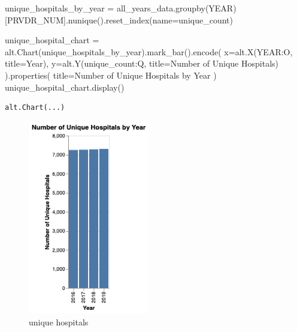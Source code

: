 \documentclass[
  letterpaper,
  DIV=11,
  numbers=noendperiod]{scrartcl}
\newenvironment{Shaded}{\begin{snugshade}}{\end{snugshade}}
\newcommand{\NormalTok}[1]{\textcolor[rgb]{0.00,0.23,0.31}{#1}}
\newcommand{\OperatorTok}[1]{\textcolor[rgb]{0.37,0.37,0.37}{#1}}
\newcommand{\StringTok}[1]{\textcolor[rgb]{0.13,0.47,0.30}{#1}}
\begin{document}
\begin{Shaded}
\begin{Highlighting}[]
\NormalTok{unique\_hospitals\_by\_year }\OperatorTok{=}\NormalTok{ all\_years\_data.groupby(}\StringTok{\textquotesingle{}YEAR\textquotesingle{}}\NormalTok{)[}\StringTok{\textquotesingle{}PRVDR\_NUM\textquotesingle{}}\NormalTok{].nunique().reset\_index(name}\OperatorTok{=}\StringTok{\textquotesingle{}unique\_count\textquotesingle{}}\NormalTok{)}

\NormalTok{unique\_hospital\_chart }\OperatorTok{=}\NormalTok{ alt.Chart(unique\_hospitals\_by\_year).mark\_bar().encode(}
\NormalTok{    x}\OperatorTok{=}\NormalTok{alt.X(}\StringTok{\textquotesingle{}YEAR:O\textquotesingle{}}\NormalTok{, title}\OperatorTok{=}\StringTok{\textquotesingle{}Year\textquotesingle{}}\NormalTok{),}
\NormalTok{    y}\OperatorTok{=}\NormalTok{alt.Y(}\StringTok{\textquotesingle{}unique\_count:Q\textquotesingle{}}\NormalTok{, title}\OperatorTok{=}\StringTok{\textquotesingle{}Number of Unique Hospitals\textquotesingle{}}\NormalTok{) }
\NormalTok{).properties(}
\NormalTok{    title}\OperatorTok{=}\StringTok{\textquotesingle{}Number of Unique Hospitals by Year\textquotesingle{}}
\NormalTok{)}
\NormalTok{unique\_hospital\_chart.display()}
\end{Highlighting}
\end{Shaded}

\begin{verbatim}
alt.Chart(...)
\end{verbatim}

\begin{figure}[H]

{\centering \includegraphics[width=2.08333in,height=\textheight,keepaspectratio]{s1p2.png}

}

\caption{unique hospitals}

\end{figure}%
\end{document}
